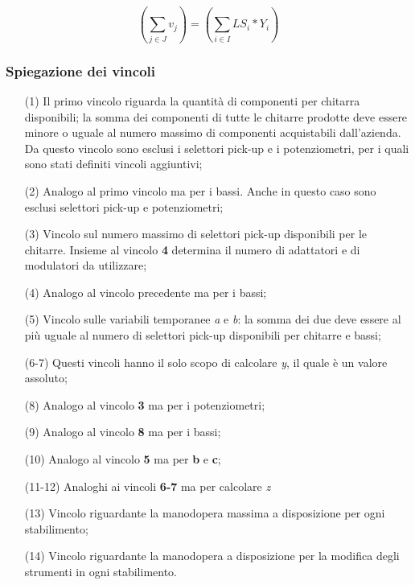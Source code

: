 \begin{equation} 
\label{vinc14}
\left ( \sum_{j\in J} v_j \right) = (\sum_{i\in I} LS_i*Y_i)
\end{equation}


\subsubsection{Spiegazione dei vincoli}
\begin{itemize}
\item[(1)] Il primo vincolo riguarda la quantità di componenti per chitarra disponibili; la somma dei componenti di tutte le chitarre prodotte deve essere minore o uguale al numero massimo di componenti acquistabili dall'azienda. Da questo vincolo sono esclusi i selettori pick-up e i potenziometri, per i quali sono stati definiti vincoli aggiuntivi;
\item[(2)] Analogo al primo vincolo ma per i bassi. Anche in questo caso sono esclusi selettori pick-up e potenziometri;
\item[(3)] Vincolo sul numero massimo di selettori pick-up disponibili per le chitarre. Insieme al vincolo \textbf{4} determina il numero di adattatori e di modulatori da utilizzare;
\item[(4)] Analogo al vincolo precedente ma per i bassi;
\item[(5)] Vincolo sulle variabili temporanee \textit{a} e \textit{b}: la somma dei due deve essere al più uguale al numero di selettori pick-up disponibili per chitarre e bassi;
\item[(6-7)] Questi vincoli hanno il solo scopo di calcolare \textit{y}, il quale è un valore assoluto;
\item[(8)] Analogo al vincolo \textbf{3} ma per i potenziometri;
\item[(9)] Analogo al vincolo \textbf{8} ma per i bassi;
\item[(10)] Analogo al vincolo \textbf{5} ma per \textbf{b} e \textbf{c};
\item[(11-12)] Analoghi ai vincoli \textbf{6-7} ma per calcolare \textit{z}
\item[(13)] Vincolo riguardante la manodopera massima a disposizione per ogni stabilimento;
\item[(14)] Vincolo riguardante la manodopera a disposizione per la modifica degli strumenti in ogni stabilimento.
\end{itemize}